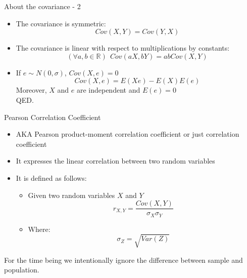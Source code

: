 \documentclass{beamer}
\begin{document}
\begin{frame}
{\centerline{About the covariance - 2}} \label{P:Covariance2}

\begin{itemize}
\item The covariance is symmetric:
 $$Cov(X,Y) = Cov(Y,X)$$
\item The covariance is linear with respect to multiplications by constants:
 $$(\forall a, b \in \mathbb{R}) ~~ Cov(aX,bY) = abCov(X,Y)$$

\item If $e \sim N(0,\sigma)$, $Cov(X,e) = 0$
$$Cov(X,e) =  E(Xe) - E(X)E(e) $$
Moreover, $X$ and $e$ are independent and $E(e) = 0$\\
QED.
\end{itemize}


\end{frame}


\begin{frame}
{\centerline{Pearson Correlation Coefficient}} \label{P:Pearson}

\begin{itemize}
\item AKA Pearson product-moment correlation coefficient or just correlation coefficient
\item It expresses the linear correlation between two random variables
\item It is defined as follows:
\begin{itemize}
\item Given two random variables $X$ and $Y$
$$r_{X,Y} = \frac{Cov(X,Y)}{\sigma_X\sigma_Y}$$
\item Where:
$$\sigma_Z = \sqrt{Var(Z)}$$
\end{itemize}
\end{itemize}

\vspace*{0.5cm}

\begin{center}
\small  For the time being we intentionally ignore the difference between sample and population.
\end{center}

\end{frame}
\end{document}
